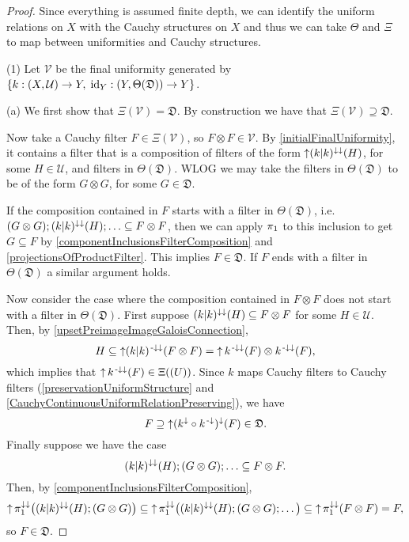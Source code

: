 \begin{proof}
Since everything is assumed finite depth, we can identify the uniform relations on $X$ with the Cauchy structures on $X$ and thus we can take $\Theta$ and $\Xi$ to map between uniformities and Cauchy structures.

(1) Let $\mathcal{V}$ be the final uniformity generated by $\{k: \sSet{X, \mathcal{U}} \to Y,\; \id_Y: \sSet{Y, \Theta(\mathfrak{D})} \to Y\}$.

(a) We first show that $\Xi(\mathcal{V}) = \mathfrak{D}$. By construction we have that $\Xi(\mathcal{V}) \supseteq \mathfrak{D}$.

Now take a Cauchy filter $F\in \Xi(\mathcal{V})$, so $F\otimes F\in \mathcal{V}$. By \ref{initialFinalUniformity}, it contains a filter that is a composition of filters of the form $\operatorname{\uparrow} (k|k)^{\downarrow\downarrow}(H)$, for some $H\in \mathcal{U}$, and filters in $\Theta(\mathfrak{D})$. WLOG we may take the filters in $\Theta(\mathfrak{D})$ to be of the form $G\otimes G$, for some $G\in \mathfrak{D}$.

If the composition contained in $F$ starts with a filter in $\Theta(\mathfrak{D})$, i.e.\ $(G\otimes G); (k|k)^{\downarrow\downarrow}(H); \ldots \subseteq F\otimes F$, then we can apply $\pi_1$ to this inclusion to get $G \subseteq F$ by \ref{componentInclusionsFilterComposition} and \ref{projectionsOfProductFilter}. This implies $F\in \mathfrak{D}$.
If $F$ ends with a filter in $\Theta(\mathfrak{D})$ a similar argument holds.

Now consider the case where the composition contained in $F\otimes F$ does not start with a filter in $\Theta(\mathfrak{D})$. First suppose $(k|k)^{\downarrow\downarrow}(H) \subseteq F\otimes F$ for some $H\in\mathcal{U}$. Then, by \ref{upsetPreimageImageGaloisConnection},
\[ H\subseteq \operatorname{\uparrow} (k|k)^{{\text{\hspace{0.15em}-}\downarrow}\downarrow}(F\otimes F) = \operatorname{\uparrow} k^{{\text{\hspace{0.15em}-}\downarrow}\downarrow}(F)\otimes k^{{\text{\hspace{0.15em}-}\downarrow}\downarrow}(F), \]
which implies that $\operatorname{\uparrow} k^{{\text{\hspace{0.15em}-}\downarrow}\downarrow}(F) \in \Xi(\mathcal(U))$. Since $k$ maps Cauchy filters to Cauchy filters (\ref{preservationUniformStructure} and \ref{CauchyContinuousUniformRelationPreserving}), we have
\[ F \supseteq \operatorname{\uparrow} (k^\downarrow \circ k^{{\text{\hspace{0.15em}-}\downarrow}})^{\downarrow}(F) \in \mathfrak{D}. \]
Finally suppose we have the case
\[ (k|k)^{\downarrow\downarrow}(H);(G\otimes G); \ldots \subseteq F\otimes F. \]
Then, by \ref{componentInclusionsFilterComposition},
\[ \operatorname{\uparrow}\pi_1^{\downarrow\downarrow} \big((k|k)^{\downarrow\downarrow}(H);(G\otimes G)\big) \subseteq \operatorname{\uparrow}\pi_1^{\downarrow\downarrow} \big((k|k)^{\downarrow\downarrow}(H);(G\otimes G);\ldots \big) \subseteq \operatorname{\uparrow}\pi_1^{\downarrow\downarrow}(F\otimes F) = F, \]
so $F\in \mathfrak{D}$.


\end{proof}
